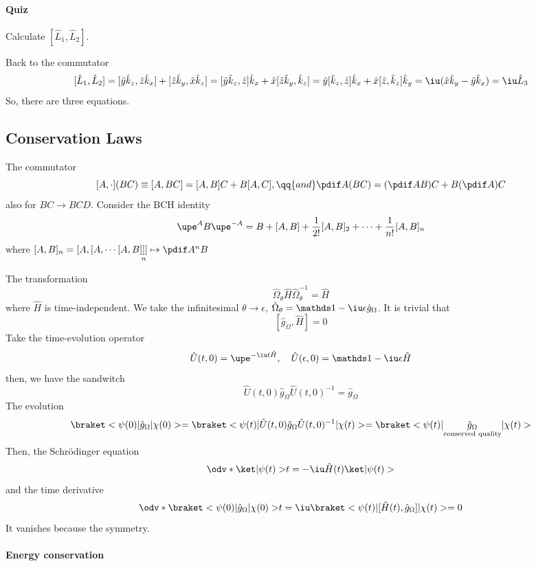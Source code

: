 \paragraph{Quiz} Calculate $[\hat L_1, \hat L_2]$.

Back to the commutator
\[
  [\hat L_1, \hat L_2]
= [\hat y\hat k_z, \hat z\hat k_x] + [\hat z\hat k_y, \hat x\hat k_z]
= [\hat y\hat k_z, \hat z] \hat k_x + \hat x[\hat z\hat k_y, \hat k_z]
= \hat y[\hat k_z, \hat z]\hat k_x + \hat x[\hat z, \hat k_z]\hat k_y
= \iu(\hat x\hat k_y - \hat y\hat k_x) = \iu\hat L_3
\]
So, there are three equations.

\subsection{Conservation Laws}

\begin{remark}[BCH]
  The commutator
  \[
    [A, \cdot] (BC) \equiv [A, BC] = [A, B]C + B[A,C], \qq{and}
    \pdif A(BC) = (\pdif AB)C + B(\pdif A)C
  \]
  also for $BC \to BCD$.
  Consider the BCH identity
  \[
    \upe^AB\upe^{-A} = B + [A, B] + \frac1{2!}[A,B]_2 + \cdots
  + \frac1{n!}[A,  B]_n
  \]
  where $[A, B]_n = [A, [A, \cdots [A, B \underset n{]]]} \mapsto \pdif A^n B$
\end{remark}
The transformation
\[
  \hat\Omega_\theta \hat H \hat\Omega_\theta^{-1} \mathbf = \hat H
\]
where $\hat H$ is time-independent.
We take the infinitesimal $\theta \to \epsilon$,
$\hat\Omega_\theta = \identity - \iu\epsilon\hat g_\Omega$.
It is trivial that
\[
  [\hat g_\Omega, \hat H] = 0
\]
Take the time-evolution operator
\[
  \hat U(t, 0) = \upe^{-\iu t\hat H}, \quad
  \hat U(\epsilon, 0) = \identity - \iu \epsilon \hat H
\]
then, we have the sandwitch
\[
  \hat U(t, 0) \hat g_\Omega \hat U(t, 0)^{-1} = \hat g_\Omega
\]
The evolution
\[
  \braket<\psi(0)|\hat g_\Omega|\chi(0)>
= \braket<\psi(t)|\hat U(t,0)\hat g_\Omega\hat U(t,0)^{-1}|\chi(t)>
= \braket<\psi(t)|\underset{\text{conserved quality}}{\hat g_\Omega}|\chi(t)>
\]
Then, the Schr\"odinger equation
\[
  \odv*{\ket|\psi(t)>}t = -\iu\hat H(t) \ket|\psi(t)>
\]
and the time derivative
\[
  \odv*{\braket<\psi(0)|\hat g_\Omega|\chi(0)>}t
= \iu\braket<\psi(t)|[\hat H(t), \hat g_\Omega]|\chi(t)> = 0
\]
It vanishes because the symmetry.

\paragraph{Energy conservation}

